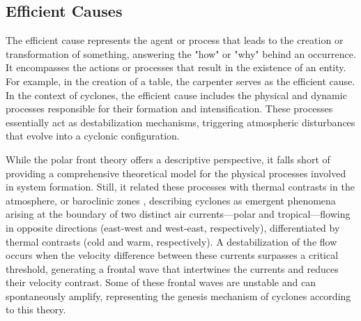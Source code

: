 \subsection{Efficient Causes}\label{efficient_causes}

The efficient cause represents the agent or process that leads to the creation or transformation of something, answering the "how" or "why" behind an occurrence. It encompasses the actions or processes that result in the existence of an entity. For example, in the creation of a table, the carpenter serves as the efficient cause. In the context of cyclones, the efficient cause includes the physical and dynamic processes responsible for their formation and intensification. These processes essentially act as destabilization mechanisms, triggering atmospheric disturbances that evolve into a cyclonic configuration.

While the polar front theory offers a descriptive perspective, it falls short of providing a comprehensive theoretical model for the physical processes involved in system formation. Still, it related these processes with thermal contrasts in the atmosphere, or baroclinic zones \citep{bjerknes1919structure,bjerknes1922life}, describing cyclones as emergent phenomena arising at the boundary of two distinct air currents—polar and tropical—flowing in opposite directions (east-west and west-east, respectively), differentiated by thermal contrasts (cold and warm, respectively). A destabilization of the flow occurs when the velocity difference between these currents surpasses a critical threshold, generating a frontal wave that intertwines the currents and reduces their velocity contrast. Some of these frontal waves are unstable and can spontaneously amplify, representing the genesis mechanism of cyclones according to this theory.

